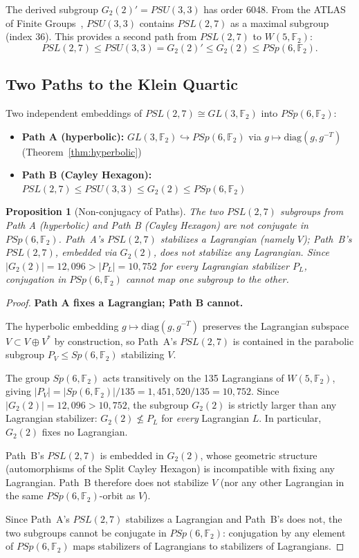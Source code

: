 \documentclass[11pt,a4paper]{article}
\newtheorem{proposition}[theorem]{Proposition}
\theoremstyle{remark}
\newcommand{\F}{\mathbb{F}}
\begin{document}
The derived subgroup $G_2(2)' = PSU(3, 3)$ has order 6048. From the
ATLAS of Finite Groups~\cite{ATLAS}, $PSU(3, 3)$ contains $PSL(2, 7)$ as a maximal
subgroup (index 36). This provides a second path from $PSL(2, 7)$ to
$W(5, \F_2)$:
\[
PSL(2, 7) \leq PSU(3, 3) = G_2(2)' \leq G_2(2) \leq PSp(6, \F_2).
\]

\subsection{Two Paths to the Klein Quartic}
\label{sec:two-paths}

Two independent embeddings of $PSL(2, 7) \cong GL(3, \F_2)$ into
$PSp(6, \F_2)$:

\begin{itemize}
  \item \textbf{Path A (hyperbolic):}
    $GL(3, \F_2) \hookrightarrow PSp(6, \F_2)$ via
    $g \mapsto \mathrm{diag}(g, g^{-T})$ (Theorem~\ref{thm:hyperbolic})
  \item \textbf{Path B (Cayley Hexagon):}
    $PSL(2, 7) \leq PSU(3, 3) \leq G_2(2) \leq PSp(6, \F_2)$
\end{itemize}

\begin{proposition}[Non-conjugacy of Paths]
\label{prop:non-conjugacy}
The two $PSL(2, 7)$ subgroups from Path A (hyperbolic) and Path B
(Cayley Hexagon) are \emph{not} conjugate in $PSp(6, \F_2)$. Path~A's
$PSL(2,7)$ stabilizes a Lagrangian (namely $V$); Path~B's $PSL(2,7)$,
embedded via $G_2(2)$, does not stabilize any Lagrangian. Since
$|G_2(2)| = 12{,}096 > |P_L| = 10{,}752$ for every Lagrangian
stabilizer $P_L$, conjugation in $PSp(6, \F_2)$ cannot map one
subgroup to the other.
\end{proposition}

\begin{proof}
\textbf{Path A fixes a Lagrangian; Path B cannot.}

The hyperbolic embedding $g \mapsto \mathrm{diag}(g, g^{-T})$ preserves
the Lagrangian subspace $V \subset V \oplus V^*$ by construction, so
Path~A's $PSL(2,7)$ is contained in the parabolic subgroup
$P_V \leq Sp(6, \F_2)$ stabilizing $V$.

The group $Sp(6, \F_2)$ acts transitively on the 135 Lagrangians of
$W(5, \F_2)$, giving $|P_V| = |Sp(6, \F_2)|/135 = 1{,}451{,}520/135 = 10{,}752$.
Since $|G_2(2)| = 12{,}096 > 10{,}752$, the subgroup $G_2(2)$ is strictly
larger than any Lagrangian stabilizer: $G_2(2) \not\leq P_L$ for
\emph{every} Lagrangian $L$. In particular, $G_2(2)$ fixes no Lagrangian.

Path~B's $PSL(2,7)$ is embedded in $G_2(2)$, whose geometric structure
(automorphisms of the Split Cayley Hexagon) is incompatible with fixing
any Lagrangian. Path~B therefore does not stabilize $V$ (nor any other
Lagrangian in the same $PSp(6,\F_2)$-orbit as $V$).

Since Path~A's $PSL(2,7)$ stabilizes a Lagrangian and Path~B's does
not, the two subgroups cannot be conjugate in $PSp(6, \F_2)$: conjugation
by any element of $PSp(6, \F_2)$ maps stabilizers of Lagrangians to
stabilizers of Lagrangians. \qedhere
\end{proof}
\end{document}

